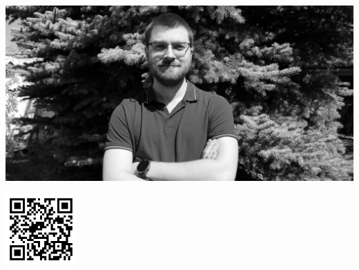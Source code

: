 \documentclass[10pt,A4]{article}
\newcommand{\spread}{7pt}
\begin{document}
\pagestyle{fancy}



\begin{minipage}[t]{0.485\textwidth}

\vspace{\spread}


\hspace{-0.25\linewidth}\colorbox{bgcol}{}

\hspace{-0.25\linewidth}\includegraphics[width=1.2725\linewidth]{self_grayscale.jpg} %

\vspace{-148pt}
\hspace{0.66\linewidth}
\includegraphics[width=77pt]{qrcode.png}
\normalsize


\vspace{70pt}

\end{minipage} 
\end{document}
